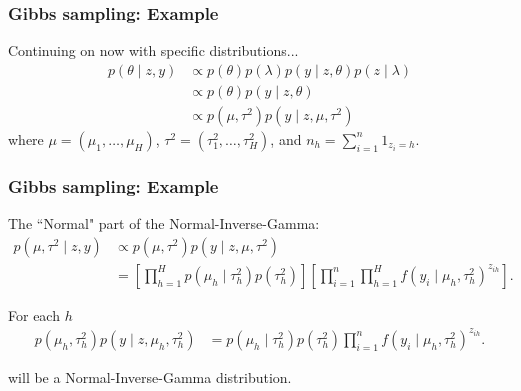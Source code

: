 \documentclass{beamer}
\begin{document}
\begin{frame}[fragile]
\frametitle{Gibbs sampling: Example}

Continuing on now with specific distributions...
\begin{align*}
p(\theta \mid z, y) &\propto p(\theta)p(\lambda )p(y \mid z, \theta)p(z \mid \lambda) \\
&\propto p(\theta)p(y \mid z, \theta) \\
&\propto p(\mu, \tau^2)p(y \mid z, \mu, \tau^2) 
\end{align*}
where $\mu = (\mu_1, \ldots, \mu_H)$, $\tau^2 = (\tau^2_1, \ldots, \tau^2_H)$, and $n_h = \sum_{i=1}^n 1_{z_{i} = h }$.





\end{frame}


\begin{frame}[fragile]
\frametitle{Gibbs sampling: Example}

The ``Normal" part of the Normal-Inverse-Gamma:
\begin{align*}
p(\mu, \tau^2 \mid z, y) &\propto p(\mu, \tau^2)p(y \mid z, \mu, \tau^2) \\
&= \left[\prod_{h=1}^H p(\mu_h \mid \tau^2_{h})p(\tau^2_{h})  \right] \left[\prod_{i=1}^n  \prod_{h=1}^H  f(y_i \mid \mu_h, \tau^2_h)^{z_{ih}} \right].
\end{align*}
\pause

For each $h$
\begin{align*}
p(\mu_h, \tau^2_h)p(y \mid z, \mu_h, \tau_h^2) &=  p(\mu_h \mid \tau^2_{h})p(\tau^2_{h})  \prod_{i=1}^n   f(y_i \mid \mu_h, \tau^2_h)^{z_{ih}}.
\end{align*}

will be a Normal-Inverse-Gamma distribution. 


\end{frame}
\end{document}
